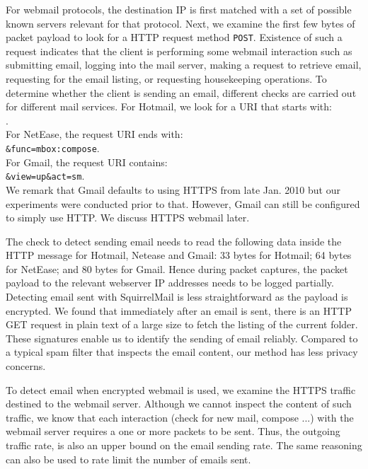 For webmail protocols, the destination IP is first matched 
with a set of possible known servers relevant for that protocol.
Next, we examine the first few bytes of packet payload to
look for a HTTP request method {\tt POST}. Existence of such a request
indicates that the client is performing some webmail
interaction such as submitting email, logging into
the mail server, making a request to retrieve email, requesting for
the email listing, or requesting housekeeping operations. To
determine whether the client is sending an email, different
checks are carried out for different mail services. For Hotmail,
we look for a URI that starts with: \\
\hspace*{1cm}{\tt mail/SendMessageLight.aspx?}. \\
For NetEase, the request URI ends with: \\
\hspace*{1cm} {\tt \&func=mbox:compose}. \\
For Gmail, the request URI contains: \\
\hspace*{1cm} {\tt \&view=up\&act=sm}. \\
We remark that Gmail defaults to using HTTPS from late Jan. 2010
but our experiments were conducted prior to that. 
However, Gmail can still be configured to simply use HTTP.
We discuss HTTPS webmail later.

The check to detect sending email needs to read the following
data inside the HTTP message for Hotmail, Netease and Gmail:
33 bytes for Hotmail; 64 bytes for NetEase; and 80 bytes for Gmail.
Hence during packet captures, the packet payload to the relevant webserver 
IP addresses needs to be logged partially.
Detecting email sent with SquirrelMail is less
straightforward as the payload is encrypted. We found that
immediately after an email is sent, there is an HTTP GET request in
plain text of a large size to fetch the listing of the current
folder. These signatures enable us to identify the sending of email reliably.
Compared to a typical spam filter that inspects the email content,
our method has less privacy concerns.

To detect email when encrypted webmail is used, 
we examine the HTTPS traffic destined to the webmail server. 
Although we cannot inspect the content of such traffic, 
we know that each interaction (check for new mail, compose ...) 
with the webmail server requires a one or more packets to be sent. 
Thus, the outgoing traffic rate, is also an upper bound on the email
sending rate.
The same reasoning can also be used to rate limit the number of emails sent.


